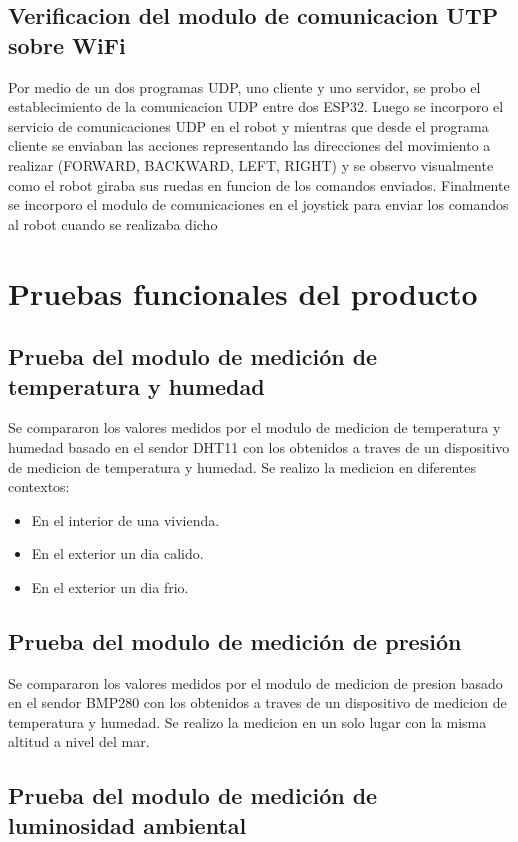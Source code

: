 \subsection{Verificacion del modulo de comunicacion UTP sobre WiFi}
Por medio de un dos programas UDP, uno cliente y uno servidor, se probo el establecimiento de la comunicacion UDP entre dos ESP32. Luego se incorporo el servicio de comunicaciones UDP en el robot y mientras que desde el programa cliente se enviaban las acciones representando las direcciones del movimiento a realizar (FORWARD, BACKWARD, LEFT, RIGHT) y se observo visualmente como el robot giraba sus ruedas en funcion de los comandos enviados. Finalmente se incorporo el modulo de comunicaciones en el joystick para enviar los comandos al robot cuando se realizaba dicho 


\section{Pruebas funcionales del producto}


\subsection{Prueba del modulo de medición de temperatura y humedad}

Se compararon los valores medidos por el modulo de medicion de temperatura y humedad basado en el sendor DHT11 con los obtenidos a traves de un dispositivo de medicion de temperatura y humedad. Se realizo la medicion en diferentes contextos:

\begin{itemize}
	\item En el interior de una vivienda.
	\item En el exterior un dia calido.
	\item En el exterior un dia frio.
\end{itemize}


\subsection{Prueba del modulo de medición de presión}

Se compararon los valores medidos por el modulo de medicion de presion basado en el sendor BMP280 con los obtenidos a traves de un dispositivo de medicion de temperatura y humedad. Se realizo la medicion en un solo lugar con la misma altitud a nivel del mar.

\subsection{Prueba del modulo de medición de luminosidad ambiental}

